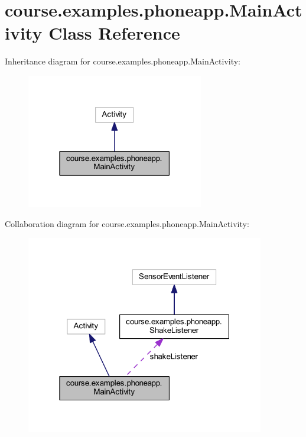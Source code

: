 \hypertarget{classcourse_1_1examples_1_1phoneapp_1_1_main_activity}{}\section{course.\+examples.\+phoneapp.\+Main\+Activity Class Reference}
\label{classcourse_1_1examples_1_1phoneapp_1_1_main_activity}


Inheritance diagram for course.\+examples.\+phoneapp.\+Main\+Activity\+:
\nopagebreak
\begin{figure}[H]
\begin{center}
\leavevmode
\includegraphics[width=219pt]{classcourse_1_1examples_1_1phoneapp_1_1_main_activity__inherit__graph}
\end{center}
\end{figure}


Collaboration diagram for course.\+examples.\+phoneapp.\+Main\+Activity\+:
\nopagebreak
\begin{figure}[H]
\begin{center}
\leavevmode
\includegraphics[width=295pt]{classcourse_1_1examples_1_1phoneapp_1_1_main_activity__coll__graph}
\end{center}
\end{figure}
